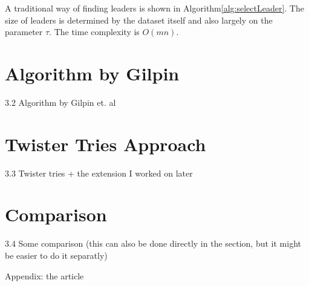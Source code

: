 \documentclass[utf8,english]{gradu3}
\begin{document}
A traditional way of finding leaders is shown in Algorithm\ref{alg:selectLeader}. The size of leaders is determined by the dataset itself and also largely on the parameter $\tau$. The time complexity is $O(mn)$.


\section{Algorithm by Gilpin}
3.2 Algorithm by Gilpin et. al

\section{Twister Tries Approach}
3.3 Twister tries + the extension I worked on later

\section{Comparison}
3.4 Some comparison (this can also be done directly in the section, but it might be easier to do it separatly)

Appendix: the article
\end{document}
